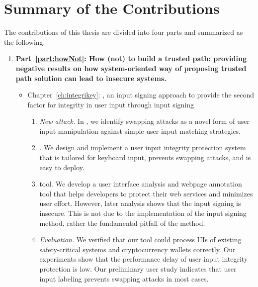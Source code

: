 \section{Summary of the Contributions}

The contributions of this thesis are divided into four parts and summarized as the following:

\begin{enumerate}[leftmargin=*]
  
  \item[] \textbf{Part~\ref{part:howNot}: How (not) to build a trusted path: providing negative results on how system-oriented way of proposing trusted path solution can lead to insecure systems.}
  
  \begin{itemize}
  \item Chapter~\ref{ch:integrikey}: \integrikey, an input signing approach to provide the second factor for integrity in user input through input signing

\begin{enumerate}
    \item \emph{New attack.} In \integrikey, we identify swapping attacks as a novel form of user input manipulation against simple user input matching strategies.
    \item \integrikey. We design and implement a user input integrity protection system that is tailored for keyboard input, prevents swapping attacks, and is easy to deploy.
    \item \integrikey{} tool. We develop a user interface analysis and webpage annotation tool that helps developers to protect their web services and minimizes user effort. However, later analysis shows that the input signing is insecure. This is not due to the implementation of the input signing method, rather the fundamental pitfall of the method.
    \item \emph{Evaluation.} We verified that our tool could process UIs of existing safety-critical systems and cryptocurrency wallets correctly. Our experiments show that the performance delay of \integrikey user input integrity protection is low. Our preliminary user study indicates that user input labeling prevents swapping attacks in most cases.
\end{enumerate}


\end{itemize}
\end{enumerate}
